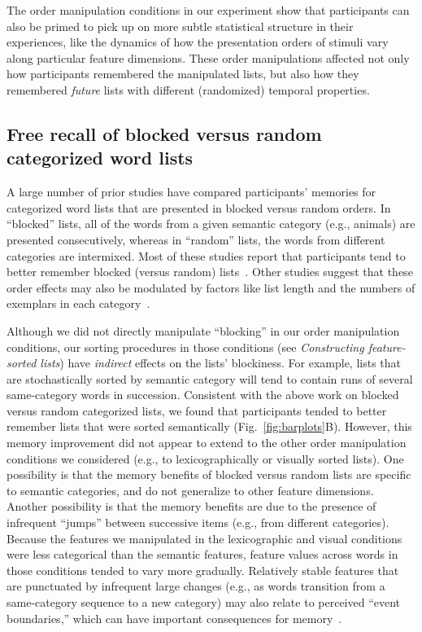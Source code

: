 \documentclass[11pt]{article}
\begin{document}
The order manipulation conditions in our experiment show that participants can
also be primed to pick up on more subtle statistical structure in their
experiences, like the dynamics of how the presentation orders of stimuli vary
along particular feature dimensions. These order manipulations affected not
only how participants remembered the manipulated lists, but also how they
remembered \textit{future} lists with different (randomized) temporal
properties.

\subsection*{Free recall of blocked versus random categorized word lists}

A large number of prior studies have compared participants' memories for
categorized word lists that are presented in blocked versus random orders. In
``blocked'' lists, all of the words from a given semantic category (e.g.,
animals) are presented consecutively, whereas in ``random'' lists, the words
from different categories are intermixed. Most of these studies report that
participants tend to better remember blocked (versus random)
lists~\citep{CofeEtal66, DAgo69, Dall64, Shap70, ShapPale70, Kint70,
BoweEtal69, LuekEtal71, Puff74}. Other studies suggest that these order
effects may also be modulated by factors like list length and the numbers of
exemplars in each category~\citep[e.g.,][]{BorgMang72}.

Although we did not directly manipulate ``blocking'' in our order manipulation
conditions, our sorting procedures in those conditions (see
\textit{Constructing feature-sorted lists}) have \textit{indirect} effects on
the lists' blockiness. For example, lists that are stochastically sorted by
semantic category will tend to contain runs of several same-category words in
succession. Consistent with the above work on blocked versus random categorized
lists, we found that participants tended to better remember lists that were
sorted semantically (Fig.~\ref{fig:barplots}B). However, this memory
improvement did not appear to extend to the other order manipulation conditions
we considered (e.g., to lexicographically or visually sorted lists). One
possibility is that the memory benefits of blocked versus random lists are
specific to semantic categories, and do not generalize to other feature
dimensions. Another possibility is that the memory benefits are due to the
presence of infrequent ``jumps'' between successive items (e.g., from different
categories). Because the features we manipulated in the lexicographic and
visual conditions were less categorical than the semantic features, feature
values across words in those conditions tended to vary more gradually.
Relatively stable features that are punctuated by infrequent large changes
(e.g., as words transition from a same-category sequence to a new category) may
also relate to perceived ``event boundaries,'' which can have important
consequences for memory~\citep{RadvZack17, DuBrEtal17, DuBrDava16, DuBrDava13}.
\end{document}
